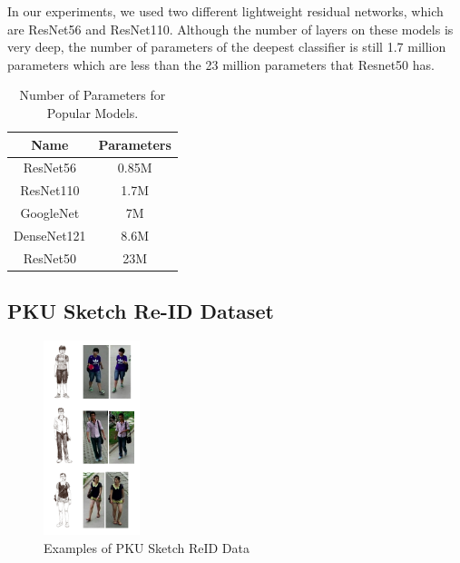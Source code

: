 \documentclass[conference]{IEEEtran}
\begin{document}
	In our experiments, we used two different lightweight residual networks, which are ResNet56 and ResNet110. Although the number of layers on these models is very deep, the number of parameters of the deepest classifier is still 1.7 million parameters which are less than the 23 million parameters that Resnet50 has.\\
	
	\begin{table}[h!]
		\begin{center}
			\begin{tabular}{|c|c|}
				\hline
				\textbf{Name} & \textbf{Parameters} \\ \hline
				ResNet56 & 0.85M \\ \hline
				ResNet110 & 1.7M \\ \hline
				GoogleNet & 7M \\ \hline
				DenseNet121 & 8.6M \\ \hline
				ResNet50 & 23M \\ \hline
			\end{tabular}
		\end{center}
		\vspace{1ex}
		\caption{Number of Parameters for Popular Models.}
		\label{tabel:1}
	\end{table}

	\subsection{PKU Sketch Re-ID Dataset}
	\vspace{1ex}
	
	\begin{figure}[h!] \centering
		\includegraphics[width=0.25\textwidth]{img/ExamplesSketchReID.png}
		\caption{Examples of PKU Sketch ReID Data}
		\label{fig:2}
	\end{figure}
    
\end{document}
